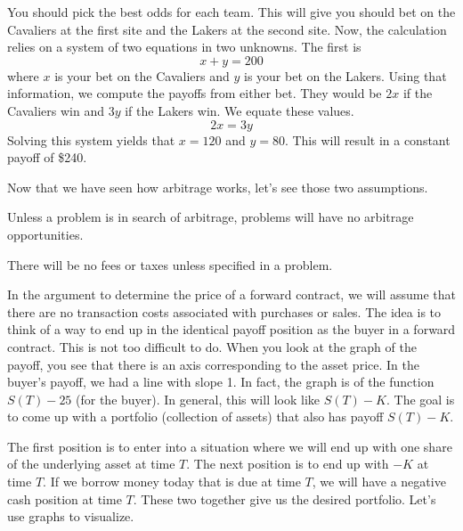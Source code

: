 \documentclass{ximera}
\begin{document}
\begin{solution}
You should pick the best odds for each team. This will give you should bet on the Cavaliers at the first site and the Lakers at the second site. Now, the calculation relies on a system of two equations in two unknowns. The first is
	\begin{equation*}
	x+y=200
	\end{equation*}
where $x$ is your bet on the Cavaliers and $y$ is your bet on the Lakers. Using that information, we compute the payoffs from either bet. They would be $2x$ if the Cavaliers win and $3y$ if the Lakers win. We equate these values.
	\begin{equation*}
	2x=3y
	\end{equation*}
Solving this system yields that $x=120$ and $y=80$. This will result in a constant payoff of \$240.
\end{solution}

Now that we have seen how arbitrage works, let's see those two assumptions.

\begin{ass}\label{ass5} Unless a problem is in search of arbitrage, problems will have no arbitrage opportunities.
\end{ass}

\begin{ass}\label{ass6} There will be no fees or taxes unless specified in a problem.
\end{ass}

In the argument to determine the price of a forward contract, we will assume that there are no transaction costs associated with purchases or sales. The idea is to think of a way to end up in the identical payoff position as the buyer in a forward contract. This is not too difficult to do. When you look at the graph of the payoff, you see that there is an axis corresponding to the asset price. In the buyer's payoff, we had a line with slope 1. In fact, the graph is of the function $S(T)-25$ (for the buyer). In general, this will look like $S(T)-K$. The goal is to come up with a portfolio (collection of assets) that also has payoff $S(T)-K$. 

The first position is to enter into a situation where we will end up with one share of the underlying asset at time $T$. The next position is to end up with $-K$ at time $T$. If we borrow money today that is due at time $T$, we will have a negative cash position at time $T$. These two together give us the desired portfolio. Let's use graphs to visualize.
\end{document}
